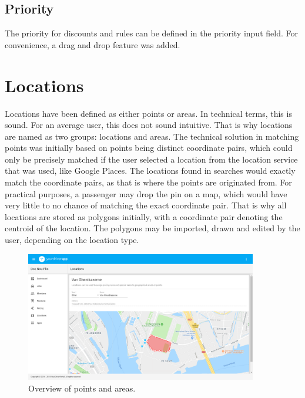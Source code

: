 \subsection{Priority}
The priority for discounts and rules can be defined in the priority input field. For convenience, a drag and drop feature was added.

\section{Locations}
Locations have been defined as either points or areas. In technical terms, this is sound. For an average user, this does not sound intuitive. That is why locations are named as two groups: locations and areas. The technical solution in matching points was initially based on points being distinct coordinate pairs, which could only be precisely matched if the user selected a location from the location service that was used, like Google Places. The locations found in searches would exactly match the coordinate pairs, as that is where the points are originated from. For practical purposes, a passenger may drop the pin on a map, which would have very little to no chance of matching the exact coordinate pair. That is why all locations are stored as polygons initially, with a coordinate pair denoting the centroid of the location. The polygons may be imported, drawn and edited by the user, depending on the location type.

\begin{figure}[H]
	\centering
	\includegraphics[width=0.9\textwidth]{Locations}
	\caption[Locations Overview]{Overview of points and areas.}
	\label{fig:Locations Overview}
\end{figure}


